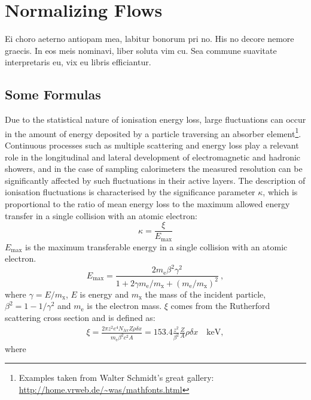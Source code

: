 \chapter{Normalizing Flows}\label{ch:mathtest} %
Ei choro aeterno antiopam mea, labitur bonorum pri no. His no decore
nemore graecis. In eos meis nominavi, liber soluta vim cu. Sea commune
suavitate interpretaris eu, vix eu libris efficiantur.

\section{Some Formulas}
Due to the statistical nature of ionisation energy loss, large
fluctuations can occur in the amount of energy deposited by a particle
traversing an absorber element\footnote{Examples taken from Walter
Schmidt's great gallery: \\
\url{http://home.vrweb.de/~was/mathfonts.html}}.  Continuous processes
such as multiple
scattering and energy loss play a relevant role in the longitudinal
and lateral development of electromagnetic and hadronic
showers, and in the case of sampling calorimeters the
measured resolution can be significantly affected by such fluctuations
in their active layers.  The description of ionisation fluctuations is
characterised by the significance parameter $\kappa$, which is
proportional to the ratio of mean energy loss to the maximum allowed
energy transfer in a single collision with an atomic electron:
\begin{equation}
\kappa =\frac{\xi}{E_{\textrm{max}}} %
\end{equation}
$E_{\textrm{max}}$ is the maximum transferable energy in a single
collision with an atomic electron.
\[
E_{\textrm{max}} =\frac{2 m_{\textrm{e}} \beta^2\gamma^2 }{1 +
2\gamma m_{\textrm{e}}/m_{\textrm{x}} + \left ( m_{\textrm{e}}
/m_{\textrm{x}}\right)^2}\ ,
\]
where $\gamma = E/m_{\textrm{x}}$, $E$ is energy and
$m_{\textrm{x}}$ the mass of the incident particle,
$\beta^2 = 1 - 1/\gamma^2$ and $m_{\textrm{e}}$ is the electron mass.
$\xi$ comes from the Rutherford scattering cross section
and is defined as:
\begin{eqnarray*} \xi  = \frac{2\pi z^2 e^4 N_{\textrm{Av}} Z \rho
\delta x}{m_{\textrm{e}} \beta^2 c^2 A} =  153.4 \frac{z^2}{\beta^2}
\frac{Z}{A}
  \rho \delta x \quad\textrm{keV},
\end{eqnarray*}
where


